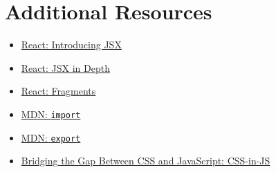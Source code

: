 \section{Additional Resources}

\begin{itemize}[leftmargin=*]
    \item \href{https://reactjs.org/docs/introducing-jsx.html}{React: Introducing JSX}
    \item \href{https://reactjs.org/docs/jsx-in-depth.html}{React: JSX in Depth}
    \item \href{https://reactjs.org/docs/fragments.html}{React: Fragments}
    \item \href{https://developer.mozilla.org/en-US/docs/Web/JavaScript/Reference/Statements/import}{MDN: \texttt{import}}
    \item \href{https://developer.mozilla.org/en-US/docs/Web/JavaScript/Reference/Statements/export}{MDN: \texttt{export}}
    \item \href{https://css-tricks.com/bridging-the-gap-between-css-and-javascript-css-in-js/}{Bridging the Gap Between CSS and JavaScript: CSS-in-JS}
\end{itemize}
